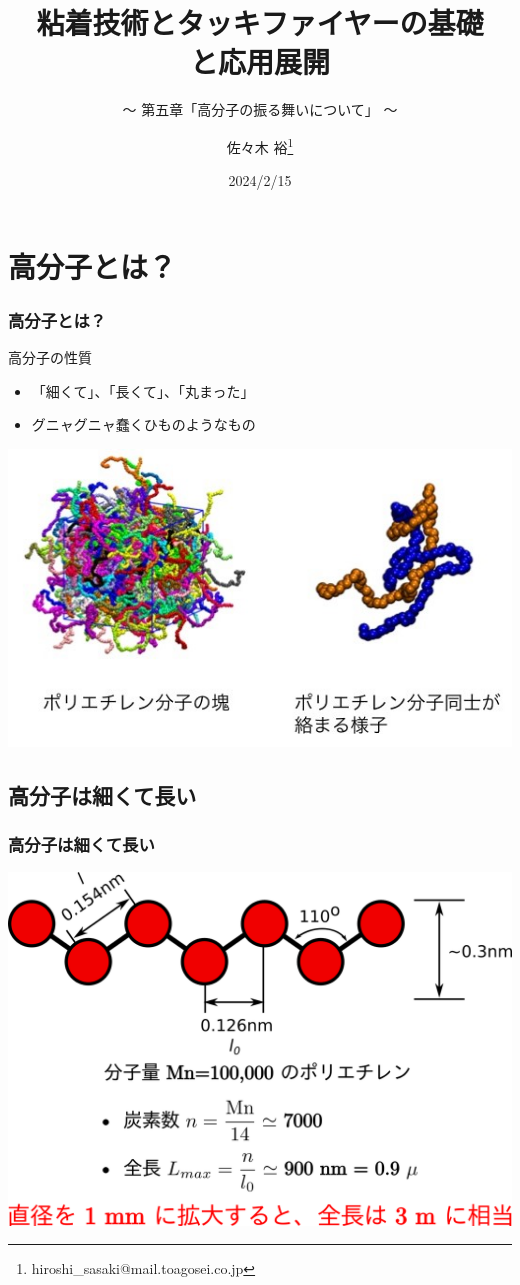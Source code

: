 \documentclass[unicode,12pt]{beamer}%
\title{粘着技術とタッキファイヤーの基礎\\と応用展開}
\subtitle{～ 第五章「高分子の振る舞いについて」 ～}
\author[東亞合成 佐々木]{佐々木 裕\thanks{hiroshi\_sasaki@mail.toagosei.co.jp}}
\institute[東亞合成]{東亞合成株式会社}
\date{2024/2/15}
\begin{document}
\maketitle

\begin{frame} 
    \tableofcontents[]
\end{frame} 

\section{高分子とは？}
\begin{frame}
	\frametitle{高分子とは？}
		\begin{block}{高分子の性質}
			\begin{itemize}
				\item 「細くて」、「⻑くて」、「丸まった」
				\item グニャグニャ蠢くひものようなもの
			\end{itemize}
		\end{block}
		\centering
		\includegraphics[width=.8\textwidth]{polymer_image.jpg}
\end{frame}

\subsection{高分子は細くて長い}
\begin{frame}
	\frametitle{高分子は細くて長い}
	\centering
	\includegraphics[width=.8\textwidth]{polymer_model.png}
\end{frame}
\end{document}

